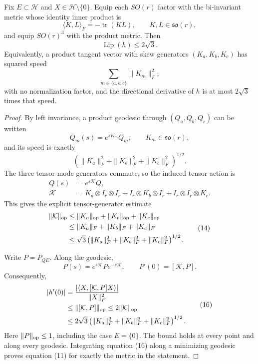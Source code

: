 \begin{lemma}
\label{lem:step-007-lipschitz}
Fix \(E\subset\mathcal H\) and \(X\in\mathcal H\setminus\{0\}\). Equip each
\(SO(r)\) factor with the bi-invariant metric whose identity inner product is
\[
  \langle K,L\rangle_F=-\operatorname{tr}(KL),
  \qquad K,L\in\mathfrak{so}(r),
\]
and equip \(SO(r)^3\) with the product metric. Then
\[
  \boxed{\operatorname{Lip}(h)\le2\sqrt3}.                  \tag{11}
\]
Equivalently, a product tangent vector with skew generators
\((K_a,K_b,K_c)\) has squared speed
\[
  \sum_{m\in\{a,b,c\}}\|K_m\|_F^2,
\]
with no normalization factor, and the directional derivative of \(h\) is at
most \(2\sqrt3\) times that speed.

\end{lemma}

\begin{proof}
By left invariance, a product geodesic through
\((Q_a,Q_b,Q_c)\) can be written
\[
  Q_m(s)=e^{sK_m}Q_m,
  \qquad K_m\in\mathfrak{so}(r),
\]
and its speed is exactly
\[
  \left(\|K_a\|_F^2+\|K_b\|_F^2+\|K_c\|_F^2\right)^{1/2}.  \tag{12}
\]
The three tensor-mode generators commute, so the induced tensor action is
\[
\begin{aligned}
  Q(s)&=e^{s\mathcal K}Q,\\
  \mathcal K
  &=K_a\otimes I_r\otimes I_r
    +I_r\otimes K_b\otimes I_r
    +I_r\otimes I_r\otimes K_c.
\end{aligned}\tag{13}
\]
This gives the explicit tensor-generator estimate
\[
\begin{aligned}
  \|\mathcal K\|_{\rm op}
  &\le \|K_a\|_{\rm op}+\|K_b\|_{\rm op}+\|K_c\|_{\rm op}\\
  &\le \|K_a\|_F+\|K_b\|_F+\|K_c\|_F\\
  &\le \sqrt3
  \left(\|K_a\|_F^2+\|K_b\|_F^2+\|K_c\|_F^2\right)^{1/2}.
\end{aligned}\tag{14}
\]

Write \(P=P_{QE}\). Along the geodesic,
\[
  P(s)=e^{s\mathcal K}Pe^{-s\mathcal K},
  \qquad P'(0)=[\mathcal K,P].                               \tag{15}
\]
Consequently,
\[
\begin{aligned}
  |h'(0)|
  &=\frac{|\langle X,[\mathcal K,P]X\rangle|}{\|X\|_F^2}\\
  &\le\|[\mathcal K,P]\|_{\rm op}
  \le2\|\mathcal K\|_{\rm op}\\
  &\le2\sqrt3
  \left(\|K_a\|_F^2+\|K_b\|_F^2+\|K_c\|_F^2\right)^{1/2}.
\end{aligned}\tag{16}
\]
Here \(\|P\|_{\rm op}\le1\), including the case \(E=\{0\}\). The bound
holds at every point and along every geodesic. Integrating equation (16)
along a minimizing geodesic proves equation (11) for exactly the metric in
the statement. 

\end{proof}


